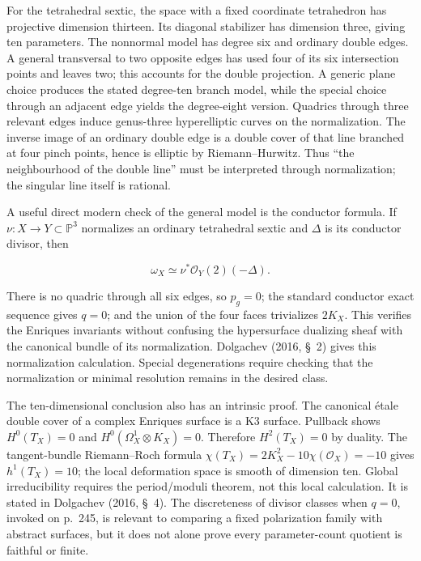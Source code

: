 For the tetrahedral sextic, the space with a fixed coordinate tetrahedron has projective dimension thirteen. Its diagonal stabilizer has dimension three, giving ten parameters. The nonnormal model has degree six and ordinary double edges. A general transversal to two opposite edges has used four of its six intersection points and leaves two; this accounts for the double projection. A generic plane choice produces the stated degree-ten branch model, while the special choice through an adjacent edge yields the degree-eight version. Quadrics through three relevant edges induce genus-three hyperelliptic curves on the normalization. The inverse image of an ordinary double edge is a double cover of that line branched at four pinch points, hence is elliptic by Riemann--Hurwitz. Thus ``the neighbourhood of the double line'' must be interpreted through normalization; the singular line itself is rational.

A useful direct modern check of the general model is the conductor formula. If \(\nu:X\to Y\subset\mathbb P^3\) normalizes an ordinary tetrahedral sextic and \(\Delta\) is its conductor divisor, then

\[
\omega_X\simeq\nu^*\mathcal O_Y(2)(-\Delta).
\]

There is no quadric through all six edges, so \(p_g=0\); the standard conductor exact sequence gives \(q=0\); and the union of the four faces trivializes \(2K_X\). This verifies the Enriques invariants without confusing the hypersurface dualizing sheaf with the canonical bundle of its normalization. Dolgachev (2016, \S~2) gives this normalization calculation. Special degenerations require checking that the normalization or minimal resolution remains in the desired class.

The ten-dimensional conclusion also has an intrinsic proof. The canonical étale double cover of a complex Enriques surface is a K3 surface. Pullback shows \(H^0(T_X)=0\) and \(H^0(\Omega_X^1\otimes K_X)=0\). Therefore \(H^2(T_X)=0\) by duality. The tangent-bundle Riemann--Roch formula \(\chi(T_X)=2K_X^2-10\chi(\mathcal O_X)=-10\) gives \(h^1(T_X)=10\); the local deformation space is smooth of dimension ten. Global irreducibility requires the period/moduli theorem, not this local calculation. It is stated in Dolgachev (2016, \S~4). The discreteness of divisor classes when \(q=0\), invoked on p.~245, is relevant to comparing a fixed polarization family with abstract surfaces, but it does not alone prove every parameter-count quotient is faithful or finite.

